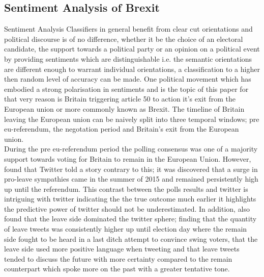 \documentclass[11pt]{report}
\begin{document}
\subsection*{Sentiment Analysis of Brexit}
Sentiment Analysis Classifiers in general benefit from clear cut orientations and political discourse is of no difference, whether it be the choice of an electoral candidate, the support towards a political party or an opinion on a political event by providing sentiments which are distinguishable i.e. the semantic orientations are different enough to warrant individual orientations, a classification to a higher then random level of accuracy can be made. One political movement which has embodied a strong polarisation in sentiments and is the topic of this paper for that very reason is Britain triggering article 50 to action it's exit from the European union or more commonly known as Brexit. The timeline of Britain leaving the European union can be naively split into three temporal windows; pre eu-referendum, the negotation period and Britain's exit from the European union.
\\

During the pre eu-referendum period the polling consensus was one of a majority support towards voting for Britain to remain in the European Union. However, \cite{porcaro_tweeting_2016} found that Twitter told a story contrary to this; it was discovered that a surge in pro-leave sympathies came in the summer of 2015 and remained persistently high up until the referendum. This contrast between the polls results and twitter is intriguing with twitter indicating the the true outcome much earlier it highlights the predictive power of twitter should not be underestimated. In addition, \cite{matsuo_more_2017} also found that the leave side dominated the twitter sphere; finding that the quantity of leave tweets was consistently higher up until election day where the remain side fought to be heard in a last ditch attempt to convince swing voters, that the leave side used more positive language when tweeting and that leave tweets tended to discuss the future with more certainty compared to the remain counterpart which spoke more on the past with a greater tentative tone. 
\\
\end{document}
